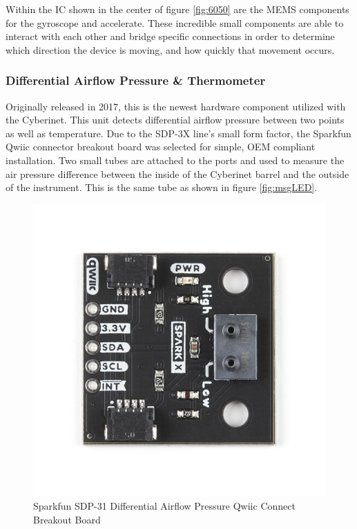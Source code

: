 Within the IC shown in the center of figure \ref{fig:6050} are the MEMS components for the gyroscope and accelerate. These incredible small components are able to interact with each other and bridge specific connections in order to determine which direction the device is moving, and how quickly that movement occurs\cite{6050HowTo}.


\subsubsection{Differential Airflow Pressure \& Thermometer}

Originally released in 2017, this is the newest hardware component utilized with the Cyberinet. This unit detects differential airflow pressure between two points as well as temperature. Due to the SDP-3X line’s small form factor, the Sparkfun Qwiic connector breakout board was selected for simple, OEM compliant installation. Two small tubes are attached to the ports and used to measure the air pressure difference between the inside of the Cyberinet barrel and the outside of the instrument. This is the same tube as shown in figure \ref{fig:msgLED}.

\begin{center}
    \begin{figure}
        \centering
        \includegraphics[scale=1.5, angle=90]{diagrams/oem/spd31.jpg}
        \caption{Sparkfun SDP-31 Differential Airflow Pressure Qwiic Connect Breakout Board} %
        \label{fig:sdp-31}
    \end{figure}
\end{center}

